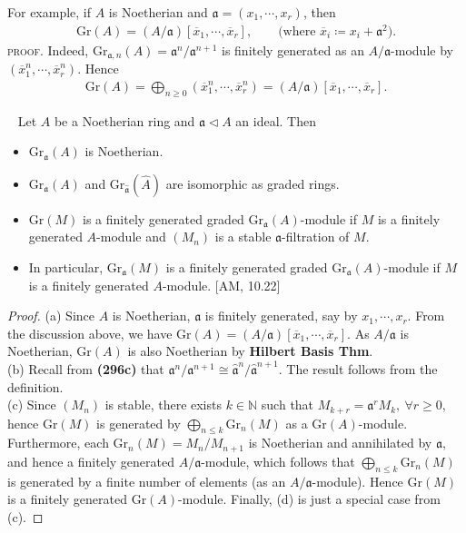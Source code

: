 \documentclass[12pt,a4paper,footinclude=true,headinclude=true]{scrbook} %
\newenvironment{proposition}[2][]
{\renewcommand\theinnercustomprop{#2}\innercustomprop[#1] 
\begin{mdframed}[backgroundcolor=gray!20]\ }
{\end{mdframed}\endinnercustomprop}
\begin{document}
For example, if $A$ is Noetherian and $\mathfrak{a}=(x_1,\cdots,x_r)$, then 
\begin{align*}
    \mathrm{Gr}(A)=(A/\mathfrak{a})[\overline{x}_1,\cdots,\overline{x}_r],\qquad\text{(where $\overline{x}_i\coloneqq x_i+\mathfrak{a}^2)$}.
\end{align*}
\textsc{proof.} Indeed, $\mathrm{Gr}_{\mathfrak{a},n}(A)=\mathfrak{a}^n/\mathfrak{a}^{n+1}$ is finitely generated as an $A/\mathfrak{a}$-module by $(\overline{x}_1^n,\cdots,\overline{x}_r^n)$. Hence
\begin{align*}
    \mathrm{Gr}(A)=\bigoplus_{n\geq0}(\overline{x}_1^n,\cdots,\overline{x}_r^n)=(A/\mathfrak{a})[\overline{x}_1,\cdots,\overline{x}_r].
\end{align*}

\begin{proposition}{305}
    Let $A$ be a Noetherian ring and $\mathfrak{a}\triangleleft A$ an ideal. Then
    \begin{itemize}
        \item[(a)] $\mathrm{Gr}_\mathfrak{a}(A)$ is Noetherian.
        \item[(b)] $\mathrm{Gr}_\mathfrak{a}(A)$ and $\mathrm{Gr}_{\widehat{\mathfrak{a}}}(\widehat{A})$ are isomorphic as graded rings.
        \item[(c)] $\mathrm{Gr}(M)$ is a finitely generated graded  $\mathrm{Gr}_\mathfrak{a}(A)$-module if $M$ is a finitely generated $A$-module and $(M_n)$ is a stable $\mathfrak{a}$-filtration of $M$. 
        \item[(d)] In particular, $\mathrm{Gr}_\mathfrak{a}(M)$ is a finitely generated graded $\mathrm{Gr}_\mathfrak{a}(A)$-module if $M$ is a finitely generated $A$-module. [AM, 10.22]
    \end{itemize}
\end{proposition}
\begin{proof}
    (a) Since $A$ is Noetherian, $\mathfrak{a}$ is finitely generated, say by $x_1,\cdots,x_r$. From the discussion above, we have $\mathrm{Gr}(A)=(A/\mathfrak{a})[\overline{x}_1,\cdots,\overline{x}_r]$. As $A/\mathfrak{a}$ is Noetherian, $\mathrm{Gr}(A)$ is also Noetherian by \textbf{Hilbert Basis Thm}.\\
    (b) Recall from \textbf{(296c)} that $\mathfrak{a}^n/\mathfrak{a}^{n+1}\cong\widehat{\mathfrak{a}}^n/\widehat{\mathfrak{a}}^{n+1}$. The result follows from the definition.\\
    (c) Since $(M_n)$ is stable, there exists $k\in\mathbb{N}$ such that $M_{k+r}=\mathfrak{a}^rM_k,\ \forall r\geq0$, hence $\mathrm{Gr}(M)$ is generated by $\bigoplus_{n\leq k}\mathrm{Gr}_n(M)$ as a $\mathrm{Gr}(A)$-module. Furthermore, each $\mathrm{Gr}_n(M)=M_n/M_{n+1}$ is Noetherian and annihilated by $\mathfrak{a}$, and hence a finitely generated $A/\mathfrak{a}$-module, which follows that $\bigoplus_{n\leq k}\mathrm{Gr}_n(M)$ is generated by a finite number of elements (as an $A/\mathfrak{a}$-module). Hence $\mathrm{Gr}(M)$ is a finitely generated $\mathrm{Gr}(A)$-module. Finally, (d) is just a special case from (c).
\end{proof}
\end{document}
